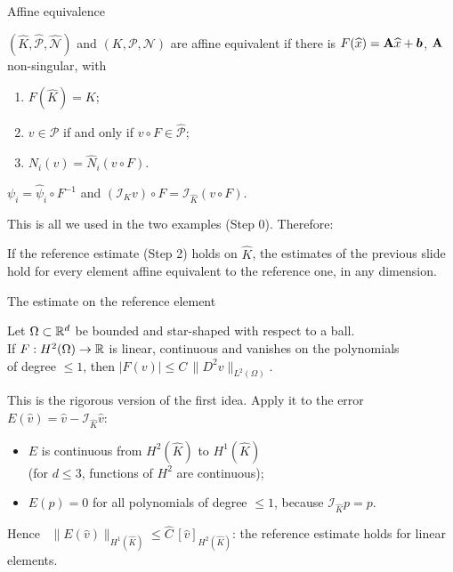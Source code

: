 \begin{frame}{Affine equivalence}
    \small
    \begin{definition}
        $(\widehat K,\widehat{\mathcal P},\widehat{\mathcal N})$ and $(K,\mathcal P,\mathcal N)$ are affine equivalent if there is $F(\widehat x) = \mathbf{A} \widehat x + \bm{b}$, $\mathbf{A}$ non-singular, with
        \begin{enumerate}
            \item $F(\widehat K) = K$;
            \item $v \in \mathcal P$ if and only if $v \circ F \in \widehat{\mathcal P}$;
            \item $N_i(v) = \widehat N_i(v \circ F)$.
        \end{enumerate}
    \end{definition}
    \begin{lemma}
        $\psi_i = \widehat\psi_i \circ F^{-1}$ \quad and \quad $(\mathcal I_K v)\circ F = \mathcal I_{\widehat K}(v \circ F)$.
    \end{lemma}
    This is all we used in the two examples (Step 0). Therefore:
    \begin{theorem}
        If the reference estimate (Step 2) holds on $\widehat K$, the estimates of the previous slide\\ hold for \alert{every} element affine equivalent to the reference one, in any dimension.
    \end{theorem}
\end{frame}

\begin{frame}{The estimate on the reference element}
    \begin{lemma}
        Let $\Omega \subset {\mathbb R}^d$ be bounded and star-shaped with respect to a ball.\\
        If $F: H^2(\Omega) \to {\mathbb R}$ is linear, continuous and vanishes on the polynomials\\
        of degree $\le 1$, then \quad $|F(v)| \le C\, \|D^2 v\|_{L^2(\Omega)}$.
    \end{lemma}
    This is the rigorous version of the first idea. Apply it to the error $E(\widehat v) = \widehat v - \mathcal I_{\widehat K} \widehat v$:
    \begin{itemize}
        \item $E$ is continuous from $H^2(\widehat K)$ to $H^1(\widehat K)$\\ (for $d \le 3$, functions of $H^2$ are continuous);
        \item $E(p) = 0$ for all polynomials of degree $\le 1$, because $\mathcal I_{\widehat K} p = p$.
    \end{itemize}
    Hence \ $\|E(\widehat v)\|_{H^1(\widehat K)} \le \widehat C\, [\widehat v]_{H^2(\widehat K)}$: the reference estimate holds for linear elements.
\end{frame}

